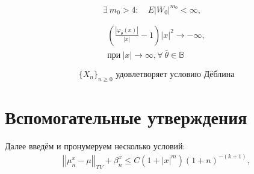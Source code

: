 \begin{equation} \label{assumption3}
    \exists \ m_0 > 4 : \quad E\left|W_0\right|^{m_0} < \infty, \quad
\end{equation}

\begin{equation} \label{assumption4}
    \begin{split}
         \left(\frac{\left|\varphi_{\bar{\theta}}(x)\right|}{|x|} - 1\right)\left|x\right|^2 \rightarrow -\infty, \\ \text{при} \ |x| \rightarrow \infty, \forall \ \bar{\theta}\in \mathbb{B}
     \end{split}
\end{equation}

\begin{equation} \label{assumption5}
    \{X_n\}_{n \geqslant 0} \text{ удовлетворяет условию Дёблина}
\end{equation}


\newpage

\section{Вспомогательные утверждения}

\begin{Definition}

\end{Definition}

Далее введём и пронумеруем несколько условий:
\begin{equation} \label{total_variation_assumption}
    \begin{split}
    \left|\left| \mu^x_n - \mu \right|\right|_{TV} + \beta^x_n \le C(1 + |x|^m)(1 + n)^{-(k + 1)},
    \end{split}
\end{equation}

